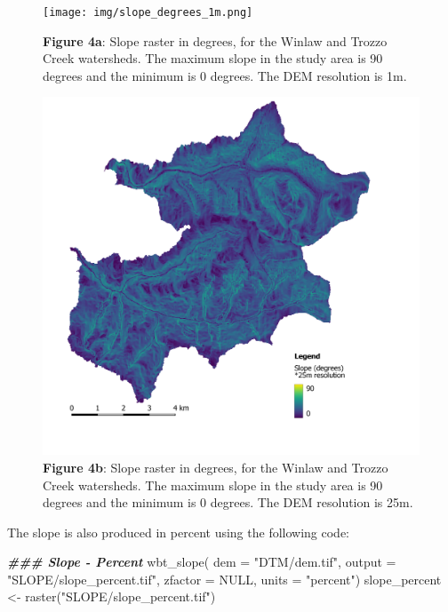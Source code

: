 \documentclass[
]{article}
\newenvironment{Shaded}{\begin{snugshade}}{\end{snugshade}}
\newcommand{\AttributeTok}[1]{\textcolor[rgb]{0.77,0.63,0.00}{#1}}
\newcommand{\ConstantTok}[1]{\textcolor[rgb]{0.00,0.00,0.00}{#1}}
\newcommand{\DocumentationTok}[1]{\textcolor[rgb]{0.56,0.35,0.01}{\textbf{\textit{#1}}}}
\newcommand{\FunctionTok}[1]{\textcolor[rgb]{0.00,0.00,0.00}{#1}}
\newcommand{\NormalTok}[1]{#1}
\newcommand{\OtherTok}[1]{\textcolor[rgb]{0.56,0.35,0.01}{#1}}
\newcommand{\StringTok}[1]{\textcolor[rgb]{0.31,0.60,0.02}{#1}}
\begin{document}
\begin{figure}
\centering
\texttt{[image: img/slope\_degrees\_1m.png]}
\caption{\textbf{Figure 4a}: Slope raster in degrees, for the Winlaw and Trozzo Creek watersheds. The maximum slope in the study area is 90 degrees and the minimum is 0 degrees. The DEM resolution is 1m.}
\end{figure}

\begin{figure}
\centering
\includegraphics{img/slope_degrees_25m.png}
\caption{\textbf{Figure 4b}: Slope raster in degrees, for the Winlaw and Trozzo Creek watersheds. The maximum slope in the study area is 90 degrees and the minimum is 0 degrees. The DEM resolution is 25m.}
\end{figure}

The slope is also produced in percent using the following code:

\begin{Shaded}
\begin{Highlighting}[]
\DocumentationTok{\#\#\# Slope {-} Percent}
\FunctionTok{wbt\_slope}\NormalTok{(}
  \AttributeTok{dem =} \StringTok{"DTM/dem.tif"}\NormalTok{, }
  \AttributeTok{output =} \StringTok{"SLOPE/slope\_percent.tif"}\NormalTok{,}
  \AttributeTok{zfactor =} \ConstantTok{NULL}\NormalTok{, }
  \AttributeTok{units =} \StringTok{"percent"}\NormalTok{)}
\NormalTok{slope\_percent }\OtherTok{\textless{}{-}} \FunctionTok{raster}\NormalTok{(}\StringTok{"SLOPE/slope\_percent.tif"}\NormalTok{)}
\end{Highlighting}
\end{Shaded}
\end{document}
